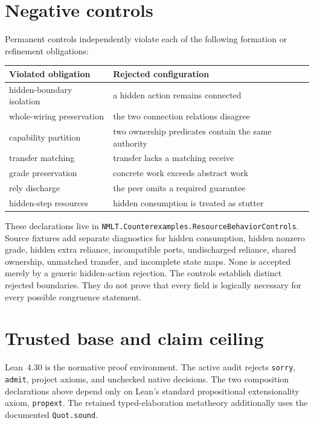 \documentclass[11pt]{article}
\begin{document}
\section{Negative controls}

Permanent controls independently violate each of the following formation or
refinement obligations:
\begin{center}
\begin{tabular}{ll}
\toprule
Violated obligation & Rejected configuration\\
\midrule
hidden-boundary isolation & a hidden action remains connected\\
whole-wiring preservation & the two connection relations disagree\\
capability partition & two ownership predicates contain the same authority\\
transfer matching & transfer lacks a matching receive\\
grade preservation & concrete work exceeds abstract work\\
rely discharge & the peer omits a required guarantee\\
hidden-step resources & hidden consumption is treated as stutter\\
\bottomrule
\end{tabular}
\end{center}
These declarations live in
\texttt{NMLT.Counterexamples.ResourceBehaviorControls}.  Source fixtures add
separate diagnostics for hidden consumption, hidden nonzero grade, hidden
extra reliance, incompatible ports, undischarged reliance, shared ownership,
unmatched transfer, and incomplete state maps.  None is accepted merely by a
generic hidden-action rejection.
The controls establish distinct rejected boundaries.  They do not prove that
every field is logically necessary for every possible congruence statement.

\section{Trusted base and claim ceiling}

Lean~4.30 is the normative proof environment.  The active audit rejects
\texttt{sorry}, \texttt{admit}, project axioms, and unchecked native
decisions.  The two composition declarations above depend only on Lean's
standard propositional extensionality axiom, \texttt{propext}.  The retained
typed-elaboration metatheory additionally uses the documented
\texttt{Quot.sound}.
\end{document}

